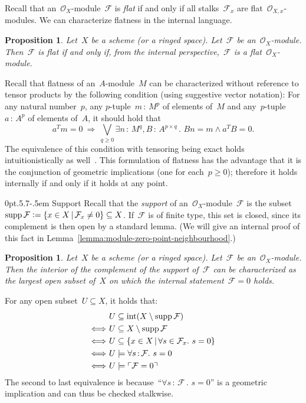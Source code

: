 \documentclass[10pt,reqno,a4paper]{amsbook}
\makeatletter
\theoremstyle{definition}
\theoremstyle{plain}
\newtheorem{prop}[defn]{Proposition}
\theoremstyle{remark}
\newcommand{\F}{\mathcal{F}}
\renewcommand{\O}{\mathcal{O}}
\DeclareMathOperator{\Int}{int}
\DeclareMathOperator{\supp}{supp}
\newcommand{\?}{\,{:}\,}
\renewcommand{\_}{\mathpunct{.}\,}
\newcommand{\speak}[1]{\ulcorner\text{\textnormal{#1}}\urcorner}
\newcommand{\defeq}{\vcentcolon=}
\renewenvironment{proof}[1][\proofname]{\par
  \pushQED{\qed}%
  \normalfont \topsep6\p@\@plus6\p@\relax
  \trivlist
  \item[\hskip\labelsep
        \itshape
    #1\@addpunct{.}]\ignorespaces
}{%
  \popQED\endtrivlist\@endpefalse
}
\def\subsection{\@startsection{subsection}{2}%
  {0pt}{.5\linespacing\@plus.7\linespacing}{-.5em}%
  {\normalfont\bfseries}}
\makeatother
\begin{document}
Recall that an~$\O_X$-module~$\F$ is \emph{flat} if and only if all
stalks~$\F_x$ are flat~$\O_{X,x}$-modules. We can characterize flatness in the
internal language.
\begin{prop}\label{prop:flatness}
Let~$X$ be a scheme (or a ringed space). Let~$\F$ be
an~$\O_X$-module. Then~$\F$ is flat if and only if, from the internal
perspective,~$\F$ is a flat~$\O_X$-module.
\end{prop}
\begin{proof}
Recall that flatness of an~$A$-module~$M$ can be characterized without
reference to tensor products by the following condition (using
suggestive vector notation): For any natural number~$p$,
any $p$-tuple~$m \? M^p$ of elements of~$M$ and
any~$p$-tuple $a \? A^p$ of elements of~$A$, it should hold that
\[
  a^T m = 0 \ \Longrightarrow\
  \bigvee\limits_{q \geq 0} \exists n\?M^q, B\?A^{p \times q}\_
  Bn = m \wedge a^T B = 0. \]
The equivalence of this condition with tensoring being exact holds
intuitionistically as
well~\cite[Theorem~III.5.3]{mines-richman-ruitenburg:constructive-algebra}.
This formulation of flatness has the advantage that it is the conjunction of
geometric implications (one for each~$p \geq 0$); therefore it holds internally
if and only if it holds at any point.
\end{proof}


\subsection{Support} Recall that the \emph{support} of an~$\O_X$-module~$\F$ is
the subset~$\supp\F \defeq \{ x \in X \,|\, \F_x \neq 0 \} \subseteq X$. If~$\F$ is
of finite type, this set is closed, since its complement is then open by a
standard lemma. (We will give an internal proof of this fact in
Lemma~\ref{lemma:module-zero-point-neighbourhood}.)

\begin{prop}\label{prop:characterization-support}
Let~$X$ be a scheme (or a ringed space). Let~$\F$ be
an~$\O_X$-module. Then the interior of the complement of the support of~$\F$
can be characterized as the largest open subset of~$X$ on which the internal
statement~$\F = 0$ holds.
\end{prop}
\begin{proof}
For any open subset~$U \subseteq X$, it holds that:
\begin{align*}
  &\ U \subseteq \Int(X \setminus \supp \F) \\
  \Longleftrightarrow&\ U \subseteq X \setminus \supp \F \\
  \Longleftrightarrow&\ U \subseteq \{ x \in X \,|\, \forall s \in \F_x\_ s = 0 \} \\
  \Longleftrightarrow&\ U \models \forall s\?\F\_ s = 0 \\
  \Longleftrightarrow&\ U \models \speak{$\F = 0$}
\end{align*}
The second to last equivalence is because~``$\forall s\?\F\_ s = 0$'' is a
geometric implication and can thus be checked stalkwise.
\end{proof}
\end{document}
